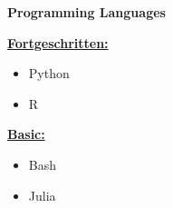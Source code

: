 \documentclass[10pt,a4paper,ragged2e,withhyper]{altacv}
\begin{document}
\begin{paracol}{2}





\bigskip

\switchcolumn{}



\vspace*{-0.25em}
\bfseries\textcolor{emphasis}{Programming Languages}
\vspace*{-1.2em}
\begin{multicols}{2}
\textbf{\underline{Fortgeschritten:}}
\vspace{0.3em}
\begin{itemize}
    \item \textnormal{Python}
    \item \textnormal{R}
\end{itemize}
\vfill
\columnbreak
\textbf{\underline{Basic:}}
\vspace{0.3em}
\begin{itemize}
    \item \textnormal{Bash}
    \item \textnormal{Julia}
\end{itemize}
\end{multicols}
\vspace*{-1.5em}
\divider{}


\end{paracol}
\end{document}
